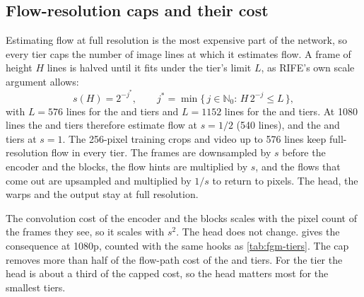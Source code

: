 \subsection{Flow-resolution caps and their cost}\label{sec:fgm-caps}

Estimating flow at full resolution is the most expensive part of the network, so every tier caps the number of image lines at which it estimates flow. A frame of height $H$ lines is halved until it fits under the tier's limit $L$, as RIFE's own scale argument allows:
\begin{equation}
s(H)=2^{-j^\ast},\qquad j^\ast=\min\big\{\,j\in\mathbb N_0:\,H\,2^{-j}\le L\,\big\},\label{eq:fgm-scale}
\end{equation}
with $L=576$ lines for the  and  tiers and $L=1152$ lines for the  and  tiers. At 1080 lines the  and  tiers therefore estimate flow at $s=1/2$ (540 lines), and the  and  tiers at $s=1$. The 256-pixel training crops and video up to 576 lines keep full-resolution flow in every tier. The frames are downsampled by $s$ before the encoder and the blocks, the flow hints are multiplied by $s$, and the flows that come out are upsampled and multiplied by $1/s$ to return to pixels. The head, the warps and the output stay at full resolution.

The convolution cost of the encoder and the blocks scales with the pixel count of the frames they see, so it scales with $s^2$. The head does not change.  gives the consequence at 1080p, counted with the same hooks as \cref{tab:fgm-tiers}. The cap removes more than half of the flow-path cost of the  and  tiers. For the  tier the head is about a third of the capped cost, so the head matters most for the smallest tiers.

